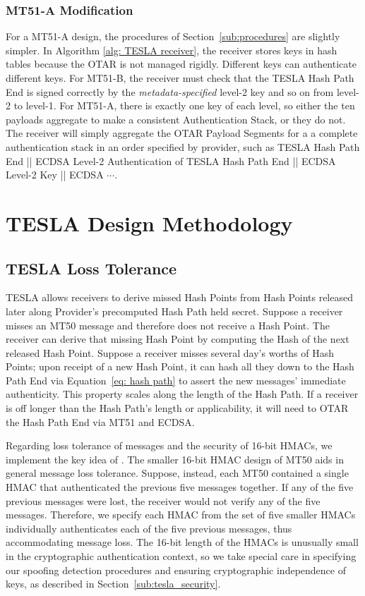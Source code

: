 \documentclass[letterpaper,times]{IONconf/IONconf}
\begin{document}
		\subsubsection{MT51-A Modification}

			For a MT51-A design, the procedures of Section~\ref{sub:procedures} are slightly simpler.
			In Algorithm \ref{alg: TESLA receiver}, the receiver stores keys in hash tables because the OTAR is not managed rigidly.
			Different keys can authenticate different keys.
			For MT51-B, the receiver must check that the TESLA Hash Path End is signed correctly by the {\em metadata-specified} level-2 key and so on from level-2 to level-1. 
			For MT51-A, there is exactly one key of each level, so either the ten payloads aggregate to make a consistent Authentication Stack, or they do not.
			The receiver will simply aggregate the OTAR Payload Segments for a a complete authentication stack in an order specified by provider, such as TESLA Hash Path End || ECDSA Level-2 Authentication of TESLA Hash Path End || ECDSA Level-2 Key || ECDSA $\cdots$.

\section{TESLA Design Methodology} \label{sec:tesla_design_methodology}

	\subsection{TESLA Loss Tolerance} \label{sub:tesla_loss_tolerance}

		TESLA allows receivers to derive missed Hash Points from Hash Points released later along Provider's precomputed Hash Path held secret.
		Suppose a receiver misses an MT50 message and therefore does not receive a Hash Point.
		The receiver can derive that missing Hash Point by computing the Hash of the next released Hash Point.
		Suppose a receiver misses several day's worths of Hash Points; upon receipt of a new Hash Point, it can hash all they down to the Hash Path End via Equation~\eqref{eq: hash path} to assert the new messages' immediate authenticity.
		This property scales along the length of the Hash Path.
		If a receiver is off longer than the Hash Path's length or applicability, it will need to OTAR the Hash Path End via MT51 and ECDSA.

		Regarding loss tolerance of messages and the security of 16-bit HMACs, we implement the key idea of \cite{Neish_Dissertation}.
		The smaller 16-bit HMAC design of MT50 aids in general message loss tolerance.
		Suppose, instead, each MT50 contained a single HMAC that authenticated the previous five messages together.
		If any of the five previous messages were lost, the receiver would not verify any of the five messages.
		Therefore, we specify each HMAC from the set of five smaller HMACs individually authenticates each of the five previous messages, thus accommodating message loss.
		The 16-bit length of the HMACs is unusually small in the cryptographic authentication context, so we take special care in specifying our spoofing detection procedures and ensuring cryptographic independence of keys, as described in Section~\ref{sub:tesla_security}.
\end{document}
